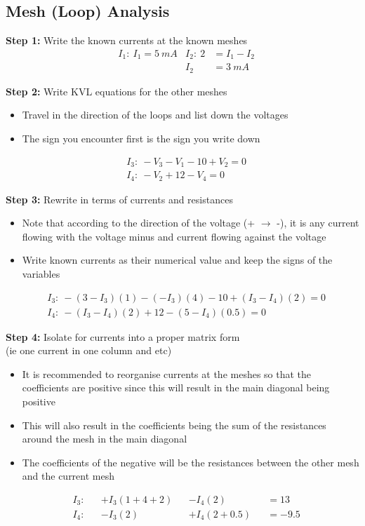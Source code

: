 \documentclass{template}
\begin{document}
\newpage
\subsection{Mesh (Loop) Analysis} %


\textbf{Step 1:} Write the known currents at the known meshes %
\begin{align*}
   &I_1: \ I_1 = 5 \: mA & I_2: \ 2 &= I_1 - I_2  \\
   &                     &       I_2&= 3 \: mA
\end{align*}

\textbf{Step 2:} Write KVL equations for the other meshes %
\begin{itemize}
    \item Travel in the direction of the loops and list down the voltages
    \item The sign you encounter first is the sign you write down
\end{itemize}
\begin{align*}
    &I_3: \ -V_3 - V_1 - 10 + V_2 = 0 \\
    &I_4: \ -V_2 + 12 - V_4 = 0
\end{align*}

\textbf{Step 3:} Rewrite in terms of currents and resistances %
\begin{itemize}
    \item Note that according to the direction of the voltage (+ $\rightarrow$ -), it is any current flowing with the voltage minus and current flowing against the voltage
    \item Write known currents as their numerical value and keep the signs of the variables
\end{itemize}
\begin{align*}
    &I_3: \ -(3 - I_3)(1) - (-I_3)(4) - 10 + (I_3 - I_4)(2) = 0 \\
    &I_4: \ -(I_3 - I_4)(2) + 12 - (5 - I_4)(0.5) = 0
\end{align*}

\textbf{Step 4:} Isolate for currents into a proper matrix form \\ %
(ie one current in one column and etc)
\begin {itemize}
    \item It is recommended to reorganise currents at the meshes so that the coefficients are positive since this will result in the main diagonal being positive
    \item This will also result in the coefficients being the sum of the resistances around the mesh in the main diagonal
    \item The coefficients of the negative will be the resistances between the other mesh and the current mesh
\end{itemize}
\begin{align*}
    &I_3: &&+I_3(1 + 4 + 2) &&- I_4(2)       &&= 13\\
    &I_4: &&-I_3(2)         &&+ I_4(2 + 0.5) &&= -9.5
\end{align*}
\end{document}
